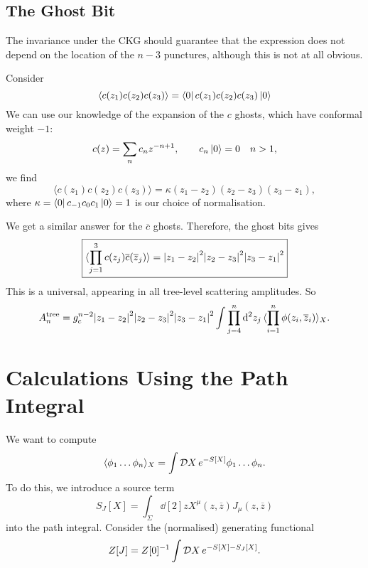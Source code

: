 \subsection{The Ghost Bit}%
\label{sub:the_ghost_bit}

The invariance under the CKG should guarantee that the expression does not depend on the location of the $n -3$ punctures, although this is not at all obvious.

Consider
\begin{equation}
  \langle c(z_1) c(z_2) c(z_3) \rangle =  \bra{0} c(z_1) c(z_2) c(z_3) \ket{0}
\end{equation}
We can use our knowledge of the expansion of the $c$ ghosts, which have conformal weight $-1$:
\begin{equation}
  c(z) = \sum_{n} c_n z^{-n + 1}, \qquad c_n \ket{0} = 0 \quad n > 1,
\end{equation}
we find
\begin{equation}
  \langle c(z_1) c(z_2) c(z_3) \rangle = \kappa (z_1 - z_2) (z_2 - z_3) (z_3 - z_1),
\end{equation}
where $\kappa = \bra{0} c_{-1} c_0 c_1 \ket{0} = 1$ is our choice of normalisation.

We get a similar answer for the $\overline{c}{}$ ghosts.
Therefore, the ghost bits gives
\begin{equation}
  \boxed{ \langle \prod_{j=1}^{3} c(z_j) \overline{c}{}(\overline{z}{}_j) \rangle = \abs{z_1 - z_2}^2 \abs{z_2 - z_3}^2 \abs{z_3 - z_1}^2 }
\end{equation}
This is a universal, appearing in all tree-level scattering amplitudes.
So 
\begin{equation}
  A_n^{\text{tree}} = g_c^{n-2} \abs{z_1 - z_2}^2 \abs{z_2 - z_3}^2 \abs{z_3 - z_1}^2 \int \prod_{j=4}^{n} \dd[2]{z_j} \langle \prod_{i=1}^{n} \phi(z_i, \overline{z}{}_i) \rangle_X.
\end{equation}

\section{Calculations Using the Path Integral}%
\label{sec:calculating_using_the_path_integral}

We want to compute
\begin{equation}
  \langle \phi_1 \dots \phi_n \rangle_X = \int \mathop{\mathcal{D} X} e^{-S[X]} \phi_1 \dots \phi_n.
\end{equation}
To do this, we introduce a source term 
\begin{equation}
  S_J[X] = \int_{\Sigma} \dd[2]{z} X^{\mu} (z, \overline{z}{}) J_{\mu} (z, \overline{z}{})
\end{equation}
into the path integral. Consider the (normalised) generating functional
\begin{equation}
  Z [J] = Z[0]^{-1} \int \mathop{\mathcal{D} X} e^{-S[X] - S_J[X]}.
\end{equation}
